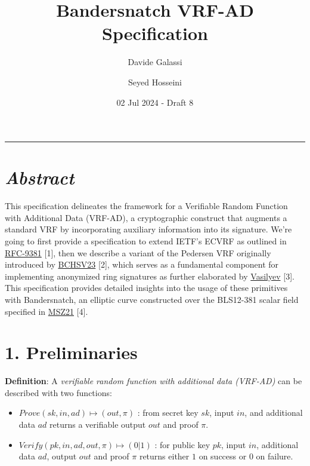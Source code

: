 \documentclass[
]{article}
\title{Bandersnatch VRF-AD Specification}
\author{Davide Galassi \and Seyed Hosseini}
\date{02 Jul 2024 - Draft 8}
\begin{document}
\maketitle

\newcommand{\G}{\langle G \rangle}
\newcommand{\F}{\mathbb{Z}^*_r}

\begin{center}\rule{0.5\linewidth}{0.5pt}\end{center}

\hypertarget{abstract}{%
\section{\texorpdfstring{\emph{Abstract}}{Abstract}}\label{abstract}}

This specification delineates the framework for a Verifiable Random
Function with Additional Data (VRF-AD), a cryptographic construct that
augments a standard VRF by incorporating auxiliary information into its
signature. We're going to first provide a specification to extend IETF's
ECVRF as outlined in
\href{https://datatracker.ietf.org/doc/rfc9381}{RFC-9381} {[}1{]}, then
we describe a variant of the Pedersen VRF originally introduced by
\href{https://eprint.iacr.org/2023/002}{BCHSV23} {[}2{]}, which serves
as a fundamental component for implementing anonymized ring signatures
as further elaborated by
\href{https://hackmd.io/ulW5nFFpTwClHsD0kusJAA}{Vasilyev} {[}3{]}. This
specification provides detailed insights into the usage of these
primitives with Bandersnatch, an elliptic curve constructed over the
BLS12-381 scalar field specified in
\href{https://eprint.iacr.org/2021/1152}{MSZ21} {[}4{]}.

\hypertarget{preliminaries}{%
\section{1. Preliminaries}\label{preliminaries}}

\textbf{Definition}: A \emph{verifiable random function with additional
data (VRF-AD)} can be described with two functions:

\begin{itemize}
\item
  \(Prove(sk,in,ad) \mapsto (out,\pi)\) : from secret key \(sk\), input
  \(in\), and additional data \(ad\) returns a verifiable output \(out\)
  and proof \(\pi\).
\item
  \(Verify(pk,in,ad,out,\pi) \mapsto (0|1)\) : for public key \(pk\),
  input \(in\), additional data \(ad\), output \(out\) and proof \(\pi\)
  returns either \(1\) on success or \(0\) on failure.
\end{itemize}
\end{document}
